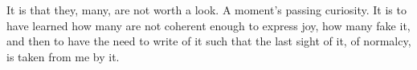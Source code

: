 

It is that they, many, are not worth a look.  A moment's passing
curiosity.  It is to have learned how many are not coherent enough to
express joy, how many fake it, and then to have the need to write of
it such that the last sight of it, of normalcy, is taken from me by
it.
\bye
